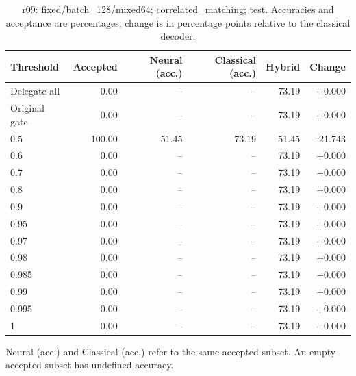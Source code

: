 \begin{table}[htbp]
\centering\small
\setlength{\tabcolsep}{3pt}
\caption{r09: fixed/batch\_128/mixed64; correlated\_matching; test. Accuracies and acceptance are percentages; change is in percentage points relative to the classical decoder.}
\begin{tabular}{lrrrrr}
\toprule
Threshold & Accepted & Neural (acc.) & Classical (acc.) & Hybrid & Change \\
\midrule
Delegate all & 0.00 & -- & -- & 73.19 & +0.000 \\
Original gate & 0.00 & -- & -- & 73.19 & +0.000 \\
0.5 & 100.00 & 51.45 & 73.19 & 51.45 & -21.743 \\
0.6 & 0.00 & -- & -- & 73.19 & +0.000 \\
0.7 & 0.00 & -- & -- & 73.19 & +0.000 \\
0.8 & 0.00 & -- & -- & 73.19 & +0.000 \\
0.9 & 0.00 & -- & -- & 73.19 & +0.000 \\
0.95 & 0.00 & -- & -- & 73.19 & +0.000 \\
0.97 & 0.00 & -- & -- & 73.19 & +0.000 \\
0.98 & 0.00 & -- & -- & 73.19 & +0.000 \\
0.985 & 0.00 & -- & -- & 73.19 & +0.000 \\
0.99 & 0.00 & -- & -- & 73.19 & +0.000 \\
0.995 & 0.00 & -- & -- & 73.19 & +0.000 \\
1 & 0.00 & -- & -- & 73.19 & +0.000 \\
\bottomrule
\end{tabular}
\par\smallskip\footnotesize Neural (acc.) and Classical (acc.) refer to the same accepted subset. An empty accepted subset has undefined accuracy.
\end{table}
